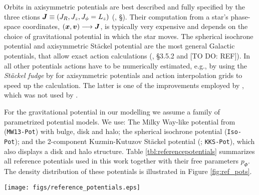 Orbits in axisymmetric potentials are best described and fully specified by the three ctions $\boldsymbol{J} \equiv (J_R, J_z, J_\phi=L_z)$ (\citealt{2008gady.book.....B}, \S \Wilma{[TO DO]}). Their computation from a star's phase-space coordinates, $(\boldsymbol{x},\boldsymbol{v}) \longrightarrow \boldsymbol{J}$, is typically very expensive and depends on the choice of gravitational potential in which the star moves. The spherical isochrone potential \citep{1959AnAp...22..126H} and axisymmetric St\"{a}ckel potential \Wilma{[TO DO: REF]} are the most general Galactic potentials, that allow exact action calculations (\citealt{2008gady.book.....B}, \S 3.5.2 and [TO DO: REF]). In all other potentials actions have to be numerically estimated, e.g., by using the \emph{St\"{a}ckel fudge} by \citet{2012MNRAS.426.1324B} for axisymmetric potentials and action interpolation grids \citep{2015ApJS..216...29B} to speed up the calculation. The latter is one of the improvements employed by \RM{}, which was not used by \citet{2013ApJ...779..115B}.

For the gravitational potential in our modelling we assume a family of parametrized potential models. We use: The Milky Way-like potential from \citet{2013ApJ...779..115B} (\texttt{MW13-Pot}) with bulge, disk and halo; the spherical isochrone potential (\texttt{Iso-Pot}); and the 2-component Kuzmin-Kutuzov St\"{a}ckel potential (\citealt{1994AA...287...43B}; \texttt{KKS-Pot}), which also displays a disk and halo structure. Table \ref{tbl:referencepotentials} summarizes all reference potentials used in this work together with their free parameters $p_\Phi$. The density distribution of these potentials is illustrated in Figure \ref{fig:ref_pots}.\\



\begin{figure*}[t]
\texttt{[image: figs/reference\_potentials.eps]}
\caption{Density distribution of the four reference galaxy potentials in Table \ref{tbl:referencepotentials}, for illustration purposes. These potentials are used throughout this work for mock data creation and potential recovery.}
\label{fig:ref_pots}
\end{figure*}








